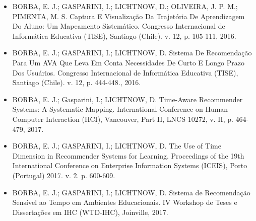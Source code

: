\begin{itemize}
\item BORBA, E. J.; GASPARINI, I.; LICHTNOW, D.; OLIVEIRA, J. P. M.; PIMENTA, M. S. Captura E Visualização Da Trajetória De Aprendizagem Do Aluno: Um Mapeamento Sistemático. Congresso Internacional de Informática Educativa (TISE), Santiago (Chile). v. 12, p. 105-111, 2016.
\item BORBA, E. J.; GASPARINI, I.; LICHTNOW, D. Sistema De Recomendação Para Um AVA Que Leva Em Conta Necessidades De Curto E Longo Prazo Dos Usuários. Congresso Internacional de Informática Educativa (TISE), Santiago (Chile). v. 12, p. 444-448., 2016.
\item BORBA, E. J.; Gasparini, I.; LICHTNOW, D. Time-Aware Recommender Systems: A Systematic Mapping. International Conference on Human-Computer Interaction (HCI), Vancouver, Part II, LNCS 10272, v. II, p. 464-479, 2017.
\item BORBA, E. J.; GASPARINI, I.; LICHTNOW, D. The Use of Time Dimension in Recommender Systems for Learning. Proceedings of the 19th International Conference on Enterprise Information Systems (ICEIS), Porto (Portugal) 2017. v. 2. p. 600-609.
\item BORBA, E. J.; GASPARINI, I.; LICHTNOW, D. Sistema de Recomendação Sensível ao Tempo em Ambientes Educacionais. IV Workshop de Teses e Dissertações em IHC (WTD-IHC), Joinville, 2017.
\end{itemize}